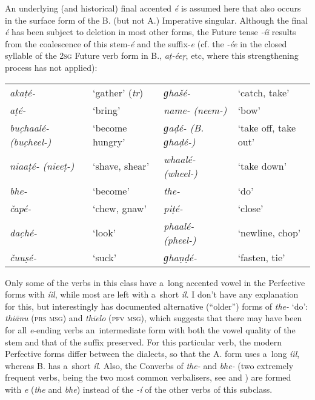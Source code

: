 An underlying (and historical) final accented \textit{é} is assumed here that also occurs in the surface form of the B. (but not A.) Imperative singular. Although the final \textit{é} has been subject to deletion in most other forms, the Future tense \textit{-íi} results from the coalescence of this stem-\textit{é} and the suffix-\textit{e} (cf. the \textit{-ée} in the closed syllable of the \textsc{2sg} Future verb form in B., \textit{aṭ-éeṛ}, etc, where this strengthening process has not applied):


\begin{table}[H]
\begin{tabularx}{\textwidth}{ Q Q Q Q }
\textit{akaṭé-} &
`gather' (\textit{tr}) &
\textit{ɡhašé-} &
`catch, take'\\
\textit{aṭé-} &
`bring' &
\textit{name- (neem-)} &
`bow'\\
\textit{buc̣haalé- (buc̣heel-)} &
`become hungry' &
\textit{ɡaḍé- (B. ɡhaḍé-)} &
`take off, take out'\\
\textit{niaaṭé- (nieeṭ-)} &
`shave, shear' &
\textit{whaalé- (wheel-)} &
`take down'\\
\textit{bhe-} &
`become' &
\textit{the-} &
`do'\\
\textit{čapé-} &
`chew, gnaw' &
\textit{piṭé-} &
`close'\\
\textit{dac̣hé-} &
`look' &
\textit{phaalé- (pheel-)} &
`newline, chop'\\
\textit{čuuṣé-} &
`suck' &
\textit{ɡhaṇḍé-} &
`fasten, tie' \\
\end{tabularx}
\end{table}


Only some of the verbs in this class have a~long accented vowel in the Perfective forms with
\textit{íil}, while most are left with a~short \textit{íl}. I don't have any explanation for
this, but interestingly \citet[22--23]{morgenstierne1941} has documented alternative (``older'')
forms of \textit{the-} `do': \textit{thiānu} (\textsc{prs msg}) and \textit{thīelo}
(\textsc{pfv msg}), which suggests that there may have been for all \textit{e}-ending verbs
an~intermediate form with both the vowel quality of the stem and that of the suffix preserved. For
this particular verb, the modern Perfective forms differ between the dialects, so that the A. form
uses a~long \textit{íil}, whereas B. has a~short \textit{íl}. Also, the Converbs of
\textit{the-} and \textit{bhe-} (two extremely frequent verbs, being the two most common
verbalisers, see  and ) are formed with \textit{e}
(\textit{the} and \textit{bhe}) instead of the \textit{-í} of the other verbs of this subclass.


